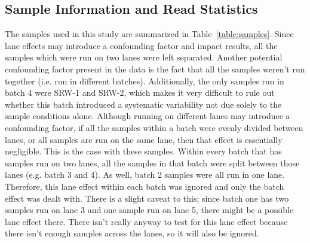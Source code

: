 \documentclass[12pt]{article}
\begin{document}
	\subsection{Sample Information and Read Statistics}
	The samples used in this study are summarized in Table~\ref{table:samples}. Since lane effects may introduce a confounding factor and impact results, all the samples which were run on two lanes were left separated. Another potential confounding factor present in the data is the fact that all the samples weren't run together (i.e. run in different batches). Additionally, the only samples run in batch 4 were SRW-1 and SRW-2, which makes it very difficult to rule out whether this batch introduced a systematic variability not due solely to the sample conditions alone. Although running on different lanes may introduce a confounding factor, if all the samples within a batch were evenly divided between lanes, or all samples are run on the same lane, then that effect is essentially negligible. This is the case with these samples. Within every batch that has samples run on two lanes, all the samples in that batch were split between those lanes (e.g. batch 3 and 4). As well, batch 2 samples were all run in one lane. Therefore, this lane effect within each batch was ignored and only the batch effect was dealt with. There is a slight caveat to this; since batch one has two samples run on lane 3 and one sample run on lane 5, there might be a possible lane effect there. There isn't really anyway to test for this lane effect because there isn't enough samples across the lanes, so it will also be ignored. 
	
\end{document}
